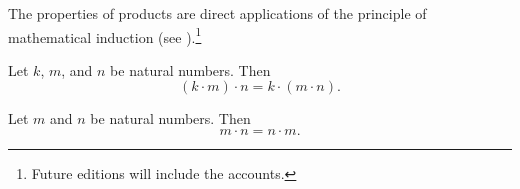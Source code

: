 The properties of products are direct applications of the principle of mathematical induction (see ).\footnote{Future editions will include the accounts.}

\begin{proposition}[Associativity]
Let $k$, $m$, and $n$ be natural numbers. Then
  \[
(k \cdot  m) \cdot  n = k \cdot  (m \cdot  n).
  \]\end{proposition}
\begin{proposition}
Let $m$ and $n$ be natural numbers. Then
  \[
m \cdot  n = n \cdot  m.
  \]\end{proposition}
